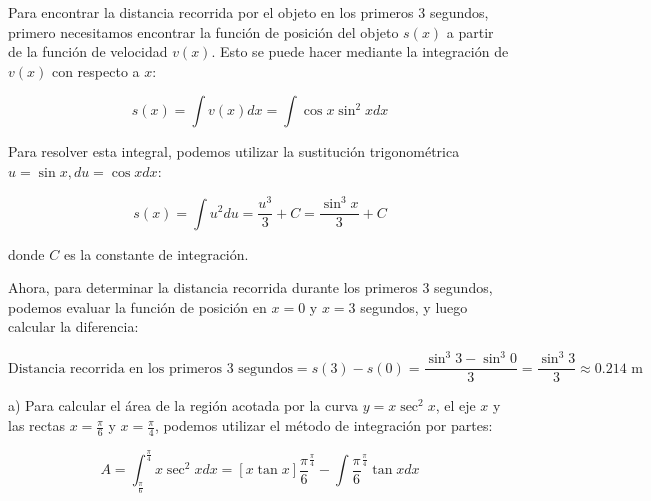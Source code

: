 \documentclass[a4paper, oneside]{report}
\begin{document}

Para encontrar la distancia recorrida por el objeto en los primeros 3 segundos, primero necesitamos encontrar la función de posición del objeto $s(x)$ a partir de la función de velocidad $v(x)$. Esto se puede hacer mediante la integración de $v(x)$ con respecto a $x$:

$$s(x) = \int v(x) dx = \int \cos{x} \sin^2{x} dx$$

Para resolver esta integral, podemos utilizar la sustitución trigonométrica $u = \sin{x}, du = \cos{x}dx$:

$$s(x) = \int u^2 du = \frac{u^3}{3} + C = \frac{\sin^3{x}}{3} + C$$

donde $C$ es la constante de integración.

Ahora, para determinar la distancia recorrida durante los primeros 3 segundos, podemos evaluar la función de posición en $x = 0$ y $x = 3$ segundos, y luego calcular la diferencia:

$$\text{Distancia recorrida en los primeros 3 segundos} = s(3) - s(0) = \frac{\sin^3{3}-\sin^3{0}}{3} = \frac{\sin^3{3}}{3} \approx 0.214\text{ m}$$



a) Para calcular el área de la región acotada por la curva $y = x\sec^2{x}$, el eje $x$ y las rectas $x = \frac{\pi}{6}$ y $x = \frac{\pi}{4}$, podemos utilizar el método de integración por partes:

$$A = \int_{\frac{\pi}{6}}^{\frac{\pi}{4}} x\sec^2{x} dx = \left[x \tan{x}\right]{\frac{\pi}{6}}^{\frac{\pi}{4}} - \int{\frac{\pi}{6}}^{\frac{\pi}{4}} \tan{x} dx$$
\end{document}
